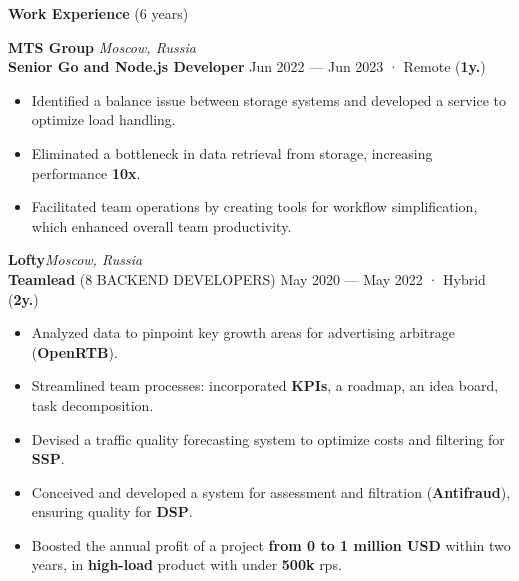 \documentclass{resume}
\begin{document}
\begin{rSection}{\textbf{Work Experience} (6 years) }

\textbf{MTS Group} \hfill \textit{Moscow, Russia} \\
\textbf{Senior Go and Node.js Developer}  \hfill Jun 2022 --- Jun 2023 · Remote ({\textbf{1y.}})
\begin{itemize}
    \setlength\itemsep{-0.4em}
    \item Identified a balance issue between storage systems and developed a service to optimize load handling\@.
    \item Eliminated a bottleneck in data retrieval from storage, increasing performance \textbf{10x}\@.
    \item Facilitated team operations by creating tools for workflow simplification, which enhanced overall team productivity\@.
\end{itemize}

\textbf{Lofty}\hfill \textit{Moscow, Russia} \\
\textbf{Teamlead} (8 BACKEND DEVELOPERS) \hfill May 2020 --- May 2022 · Hybrid ({\textbf{2y.}})
\begin{itemize}
    \item Analyzed data to pinpoint key growth areas for advertising arbitrage (\textbf{OpenRTB})\@.
    \item Streamlined team processes: incorporated \textbf{KPIs}, a roadmap, an idea board, task decomposition\@.
    \item Devised a traffic quality forecasting system to optimize costs and filtering for \textbf{SSP}\@.
    \item Conceived and developed a system for assessment and filtration (\textbf{Antifraud}), ensuring quality for \textbf{DSP}\@.
    \item Boosted the annual profit of a project \textbf{from 0 to 1 million USD} within two years, in \textbf{high-load} product with under \textbf{500k} rps\@.
\end{itemize}


\end{rSection}
\end{document}
